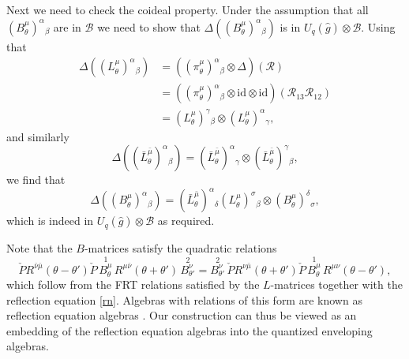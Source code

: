 \documentclass[a4paper,12pt]{article}
\newcommand{\uqgh}{U_q(\hat{g})}
\newcommand{\id}{\text{id}}
\newcommand{\mub}{\bar{\mu}}
\newcommand{\nub}{\bar{\nu}}
\newcommand{\sa}{{\mathcal{B}}}
\numberwithin{equation}{section}
\begin{document}
Next we need to check the coideal property. Under the assumption
that all $(B^{\mu}_\theta)^\alpha{}_\beta$ are in $\sa$ we need to
show that $\Delta\left((B^{\mu}_\theta)^\alpha{}_\beta\right)$ is
in $\uqgh\otimes\sa$. Using that
\begin{align}
  \Delta\left((L^\mu_\theta)^\alpha{}_\beta\right)
  &=\left((\pi^\mu_\theta)^\alpha{}_\beta\otimes\Delta\right)
  ({\mathcal R})\\
  &=\left((\pi^\mu_\theta)^\alpha{}_\beta\otimes\id\otimes\id\right)
  ({\mathcal R}_{13}{\mathcal R}_{12})\\
  &=(L^\mu_\theta)^\gamma{}_\beta\otimes
  (L^\mu_\theta)^\alpha{}_\gamma,
\end{align}
and similarly
\begin{equation}
  \Delta\left((\bar{L}^{\mub}_\theta)^\alpha{}_\beta\right)
  =(\bar{L}^{\mub}_\theta)^\alpha{}_\gamma\otimes
  (\bar{L}^{\mub}_\theta)^\gamma{}_\beta,
\end{equation}
we find that
\begin{equation}
  \Delta\left((B^{\mu}_\theta)^\alpha{}_\beta\right)
  =(\bar{L}^{\mub}_\theta)^\alpha{}_\delta
  (L^\mu_\theta)^\sigma{}_\beta
  \otimes (B^{\mu}_\theta)^\delta{}_\sigma,
\end{equation}
which is indeed in $\uqgh\otimes\sa$ as required.


Note that the $B$-matrices satisfy the quadratic relations
\begin{equation}
  \check{P}R^{\nub\mub}(\theta-\theta')\check{P}\,
  \overset{1}{B^\mu_\theta}\,
  R^{\mu\nub}(\theta+\theta')\,
  \overset{2}{B^\nu_{\theta'}}
  =\overset{2}{B^\nu_{\theta'}}\,
  \check{P}R^{\nu\mub}(\theta+\theta')\check{P}\,
  \overset{1}{B^\mu_\theta}\,
  R^{\mu\nu}(\theta-\theta'),
\end{equation}
which follow from the FRT relations satisfied by the $L$-matrices
together with the reflection equation \eqref{rn}. Algebras with
relations of this form are known as reflection equation algebras
\cite{skl}. Our construction can thus be viewed as an embedding of
the reflection equation algebras into the quantized enveloping
algebras.


%
\end{document}
